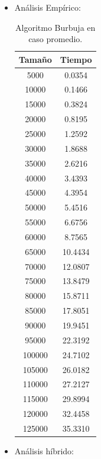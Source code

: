 \documentclass[a4paper,12pt,twoside]{article} %
\begin{document}
		\begin{itemize}
		\item Análisis Empírico:
		
\begin{table}[h]
	\begin{center}
		\begin{tabular}{|c|c|}
		\hline
		Tamaño & Tiempo \\
		\hline
		5000 & 0.0354 \\
		10000 & 0.1466 \\
		15000 & 0.3824 \\
		20000 & 0.8195 \\	
		25000 & 1.2592 \\
		30000 & 1.8688 \\
		35000 & 2.6216 \\
		40000 & 3.4393 \\
		45000 & 4.3954 \\
		50000 & 5.4516 \\
		55000 & 6.6756 \\
		60000 & 8.7565 \\
		65000 & 10.4434 \\
		70000 & 12.0807 \\
		75000 & 13.8479 \\
		80000 & 15.8711 \\
		85000 & 17.8051 \\
		90000 & 19.9451 \\
		95000 & 22.3192 \\
		100000 & 24.7102 \\
		105000 & 26.0182 \\
		110000 & 27.2127 \\
		115000 & 29.8994 \\
		120000 & 32.4458 \\
		125000 & 35.3310 \\
		\hline
		\end{tabular}
	\end{center}
	\caption{Algoritmo Burbuja en caso promedio.}
\end{table}

\newpage
		\item Análisis híbrido:
		
\begin{figure}[h]
  \begin{center}
  

\end{center}
\end{figure}
\end{itemize}
\end{document}

